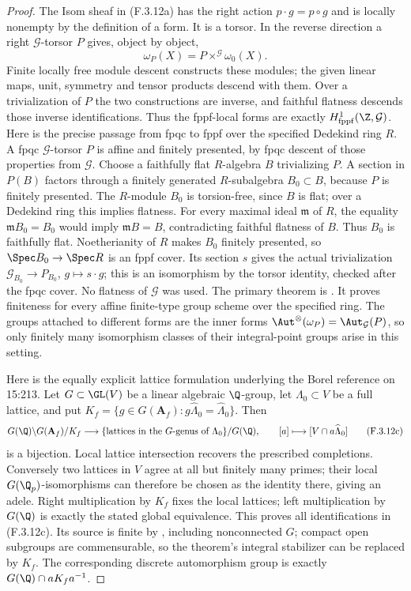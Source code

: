 \begin{proof}
The Isom sheaf in (F.3.12a) has the right action
$p\cdot g=p\circ g$ and is locally nonempty by the definition
of a form. It is a torsor. In the reverse direction a right
$\mathcal G$-torsor $P$ gives, object by object,
\[
                  \omega_P(X)=P\times^{\mathcal G}\omega_0(X).
 \tag{F.3.12b}
\]
Finite locally free module descent constructs these modules;
the given linear maps, unit, symmetry and tensor products
descend with them. Over a trivialization of $P$ the two
constructions are inverse, and faithful flatness descends
those inverse identifications. Thus the fppf-local forms
are exactly $H^1_{\rm fppf}(\Z,\mathcal G)$.
Here is the precise passage from fpqc to fppf over the
specified Dedekind ring $R$. A fpqc $\mathcal G$-torsor $P$
is affine and finitely presented, by fpqc descent of those
properties from $\mathcal G$. Choose a faithfully flat
$R$-algebra $B$ trivializing $P$. A section in $P(B)$
factors through a finitely generated $R$-subalgebra
$B_0\subset B$, because $P$ is finitely presented.
The $R$-module $B_0$ is torsion-free, since $B$ is flat;
over a Dedekind ring this implies flatness. For every
maximal ideal $\mathfrak m$ of $R$, the equality
$\mathfrak m B_0=B_0$ would imply
$\mathfrak m B=B$, contradicting faithful flatness of $B$.
Thus $B_0$ is faithfully flat. Noetherianity of $R$ makes
$B_0$ finitely presented, so $\Spec B_0\to\Spec R$ is an
fppf cover. Its section $s$ gives the actual trivialization
$\mathcal G_{B_0}\to P_{B_0}$, $g\mapsto s\cdot g$;
this is an isomorphism by the torsor identity, checked after
the fpqc cover. No flatness of $\mathcal G$ was used.
The primary theorem is
\cite[Proposition 5.1, author preprint pp.8--10]{AuditGilleMoretBailly2013}.
It proves finiteness for every affine finite-type group
scheme over the specified ring. The groups attached to
different forms are the inner forms
$\Aut^\otimes(\omega_P)=\Aut_{\mathcal G}(P)$, so only
finitely many isomorphism classes of their integral-point
groups arise in this setting.

Here is the equally explicit lattice formulation underlying
the Borel reference on 15:213. Let $G\subset\GL(V)$ be a
linear algebraic $\Q$-group, let $\Lambda_0\subset V$ be a
full lattice, and put
$K_f=\{g\in G(\mathbf A_f):g\widehat\Lambda_0=\widehat\Lambda_0\}$.
Then
\[
 G(\Q)\backslash G(\mathbf A_f)/K_f
 \longrightarrow
 \{\text{lattices in the $G$-genus of $\Lambda_0$}\}/G(\Q),
 \qquad [a]\longmapsto[V\cap a\widehat\Lambda_0]
 \tag{F.3.12c}
\]
is a bijection. Local lattice intersection recovers the
prescribed completions. Conversely two lattices in $V$
agree at all but finitely many primes; their local
$G(\Q_p)$-isomorphisms can therefore be chosen as the identity
there, giving an adele. Right multiplication by $K_f$ fixes
the local lattices; left multiplication by $G(\Q)$ is exactly
the stated global equivalence. This proves all identifications
in (F.3.12c). Its source is finite by
\cite[\S2.1 and Theorem 5.1, p.19]{AuditBorel1963}, including
nonconnected $G$; compact open subgroups are commensurable,
so the theorem's integral stabilizer can be replaced by $K_f$.
The corresponding discrete automorphism group is exactly
$G(\Q)\cap aK_fa^{-1}$.


\end{proof}
